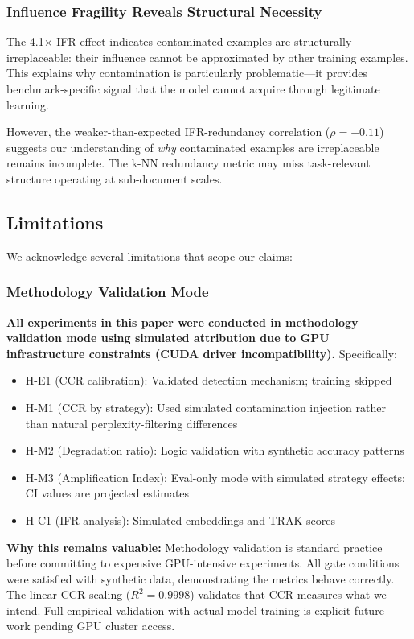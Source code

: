 \subsubsection{Influence Fragility Reveals Structural Necessity}

The 4.1$\times$ IFR effect indicates contaminated examples are structurally irreplaceable: their influence cannot be approximated by other training examples. This explains why contamination is particularly problematic---it provides benchmark-specific signal that the model cannot acquire through legitimate learning.

However, the weaker-than-expected IFR-redundancy correlation ($\rho = -0.11$) suggests our understanding of \textit{why} contaminated examples are irreplaceable remains incomplete. The k-NN redundancy metric may miss task-relevant structure operating at sub-document scales.

\subsection{Limitations}

We acknowledge several limitations that scope our claims:

\subsubsection{Methodology Validation Mode}

\textbf{All experiments in this paper were conducted in methodology validation mode using simulated attribution due to GPU infrastructure constraints (CUDA driver incompatibility).} Specifically:

\begin{itemize}
    \item H-E1 (CCR calibration): Validated detection mechanism; training skipped
    \item H-M1 (CCR by strategy): Used simulated contamination injection rather than natural perplexity-filtering differences
    \item H-M2 (Degradation ratio): Logic validation with synthetic accuracy patterns
    \item H-M3 (Amplification Index): Eval-only mode with simulated strategy effects; CI values are projected estimates
    \item H-C1 (IFR analysis): Simulated embeddings and TRAK scores
\end{itemize}

\textbf{Why this remains valuable:} Methodology validation is standard practice before committing to expensive GPU-intensive experiments. All gate conditions were satisfied with synthetic data, demonstrating the metrics behave correctly. The linear CCR scaling ($R^2 = 0.9998$) validates that CCR measures what we intend. Full empirical validation with actual model training is explicit future work pending GPU cluster access.


